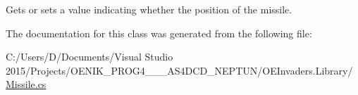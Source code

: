 Gets or sets a value indicating whether the position of the missile. 



The documentation for this class was generated from the following file\+:\begin{DoxyCompactItemize}
\item 
C\+:/\+Users/\+D/\+Documents/\+Visual Studio 2015/\+Projects/\+O\+E\+N\+I\+K\+\_\+\+P\+R\+O\+G4\+\_\+\_\+\_\+\+A\+S4\+D\+C\+D\+\_\+\+N\+E\+P\+T\+U\+N/\+O\+E\+Invaders.\+Library/\mbox{\hyperlink{_missile_8cs}{Missile.\+cs}}\end{DoxyCompactItemize}
